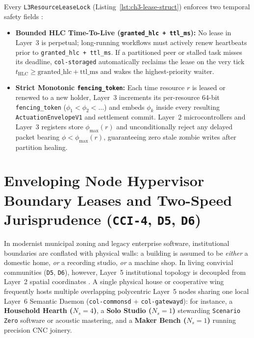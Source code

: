 Every \texttt{L3ResourceLeaseLock} (Listing~\ref{lst:ch3-lease-struct}) enforces two
temporal safety fields \parencite{kulkarni2014logical,kleppmann2017designing}:
\begin{itemize}
\item \textbf{Bounded HLC Time-To-Live (\texttt{granted\_hlc + ttl\_ms}):} No lease in
        Layer~3 is perpetual; long-running workflows must actively renew heartbeats prior to
        \texttt{granted\_hlc + ttl\_ms}. If a partitioned peer or stalled task misses its
        deadline, \texttt{col-storaged} automatically reclaims the lease on the very tick
        $t_{\mathrm{HLC}} \ge \mathrm{granted\_hlc} + \mathrm{ttl\_ms}$ and wakes the
        highest-priority waiter.
\item \textbf{Strict Monotonic \texttt{fencing\_token}:} Each time resource $r$ is leased or
        renewed to a new holder, Layer~3 increments its per-resource 64-bit
        \texttt{fencing\_token} ($\phi_1 < \phi_2 < \dots$) and embeds $\phi_k$ inside every
        resulting \texttt{ActuationEnvelopeV1} and settlement commit. Layer~2
        microcontrollers and Layer~3 registers store $\phi_{\max}(r)$ and unconditionally
        reject any delayed packet bearing $\phi < \phi_{\max}(r)$, guaranteeing zero stale
        zombie writes after partition healing.
\end{itemize}

\section{Enveloping Node Hypervisor Boundary Leases and Two-Speed Jurisprudence (\texttt{CCI-4}, \texttt{D5}, \texttt{D6})}
\label{sec:ch3-enveloping-hypervisor}

In modernist municipal zoning and legacy enterprise software, institutional boundaries are
conflated with physical walls: a building is assumed to be \textit{either} a domestic home,
\textit{or} a recording studio, \textit{or} a machine shop. In living convivial communities
(\texttt{D5}, \texttt{D6}), however, Layer~5 institutional topology is decoupled from
Layer~2 spatial coordinates \parencite{ostrom2010,habraken1972supports}. A single physical
house or cooperative wing frequently hosts multiple overlapping polycentric Layer~5 nodes
sharing one local Layer~6 Semantic Daemon (\texttt{col-commonsd} + \texttt{col-gatewayd}):
for instance, a \textbf{Household Hearth ($N_s = 4$)}, a \textbf{Solo Studio ($N_s = 1$)}
stewarding \texttt{Scenario Zero} software or acoustic mastering, and a \textbf{Maker Bench
($N_s = 1$)} running precision CNC joinery.

